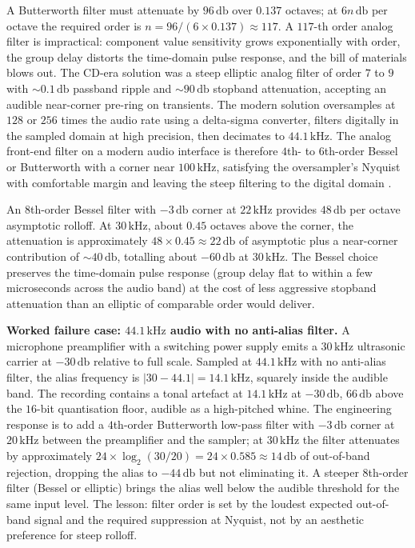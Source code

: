 A Butterworth filter must attenuate by $96 \,\si{\decibel}$ over
$0.137$ octaves; at $6n \,\si{\decibel}$ per octave the required
order is $n = 96 / (6 \times 0.137) \approx 117$. A $117$-th order
analog filter is impractical: component value sensitivity grows
exponentially with order, the group delay distorts the time-domain
pulse response, and the bill of materials blows out. The CD-era
solution was a steep elliptic analog filter of order $7$ to $9$
with $\sim 0.1 \,\si{\decibel}$ passband ripple and $\sim 90 \,\si
{\decibel}$ stopband attenuation, accepting an audible
near-corner pre-ring on transients. The modern solution
oversamples at $128$ or $256$ times the audio rate using a
delta-sigma converter, filters digitally in the sampled domain at
high precision, then decimates to $44.1 \,\si{\kilo\hertz}$. The
analog front-end filter on a modern audio interface is therefore
$4$th- to $6$th-order Bessel or Butterworth with a corner near
$100 \,\si{\kilo\hertz}$, satisfying the oversampler's Nyquist
with comfortable margin and leaving the steep filtering to the
digital domain \cite{text:ch06-oppenheim-schafer-2010}.

An $8$th-order Bessel filter with $-3 \,\si{\decibel}$ corner at
$22 \,\si{\kilo\hertz}$ provides $48 \,\si{\decibel}$ per octave
asymptotic rolloff. At $30 \,\si{\kilo\hertz}$, about $0.45$
octaves above the corner, the attenuation is approximately $48
\times 0.45 \approx 22 \,\si{\decibel}$ of asymptotic plus a
near-corner contribution of $\sim 40 \,\si{\decibel}$, totalling
about $-60 \,\si{\decibel}$ at $30 \,\si{\kilo\hertz}$. The Bessel
choice preserves the time-domain pulse response (group delay flat
to within a few microseconds across the audio band) at the cost of
less aggressive stopband attenuation than an elliptic of
comparable order would deliver.

\textbf{Worked failure case: $44.1 \,\si{\kilo\hertz}$ audio with
no anti-alias filter.} A microphone preamplifier with a switching
power supply emits a $30 \,\si{\kilo\hertz}$ ultrasonic carrier at
$-30 \,\si{\decibel}$ relative to full scale. Sampled at $44.1
\,\si{\kilo\hertz}$ with no anti-alias filter, the alias frequency
is $|30 - 44.1| = 14.1 \,\si{\kilo\hertz}$, squarely inside the
audible band. The recording contains a tonal artefact at $14.1
\,\si{\kilo\hertz}$ at $-30 \,\si{\decibel}$, $66 \,\si{\decibel}$
above the $16$-bit quantisation floor, audible as a high-pitched
whine. The engineering response is to add a $4$th-order Butterworth
low-pass filter with $-3 \,\si{\decibel}$ corner at $20 \,\si{\kilo
\hertz}$ between the preamplifier and the sampler; at $30 \,\si
{\kilo\hertz}$ the filter attenuates by approximately $24 \times
\log_{2}(30/20) = 24 \times 0.585 \approx 14 \,\si{\decibel}$ of
out-of-band rejection, dropping the alias to $-44 \,\si{\decibel}$
but not eliminating it. A steeper $8$th-order filter (Bessel or
elliptic) brings the alias well below the audible threshold for
the same input level. The lesson: filter order is set by the
loudest expected out-of-band signal and the required suppression
at Nyquist, not by an aesthetic preference for steep rolloff.

